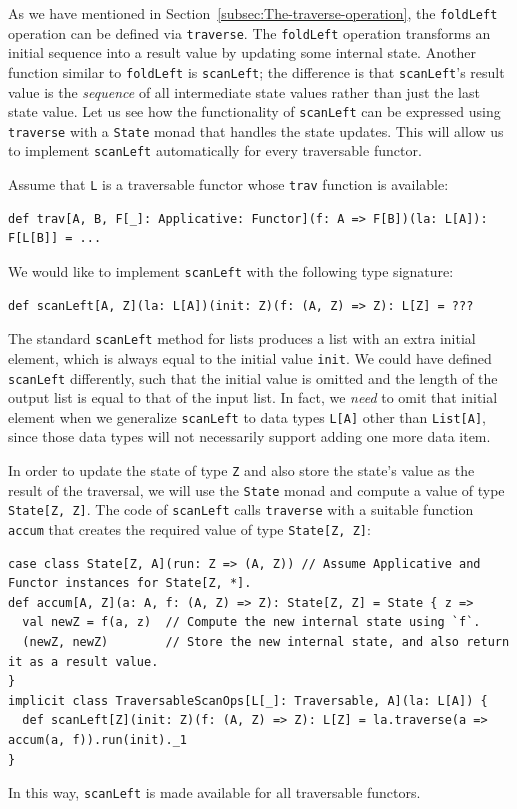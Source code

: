 As we have mentioned in Section~\ref{subsec:The-traverse-operation},
the \lstinline!foldLeft! operation can be defined via \lstinline!traverse!.
The \lstinline!foldLeft! operation transforms an initial sequence
into a result value by updating some internal state. Another function
similar to \lstinline!foldLeft! is \lstinline!scanLeft!; the difference
is that \lstinline!scanLeft!\textsf{'}s result value is the \emph{sequence}
of all intermediate state values rather than just the last state value.
Let us see how the functionality of \lstinline!scanLeft! can be expressed
using \lstinline!traverse! with a \lstinline!State! monad that handles
the state updates. This will allow us to implement \lstinline!scanLeft!
automatically for every traversable functor.

Assume that \lstinline!L! is a traversable functor whose \lstinline!trav!
function is available:
\begin{lstlisting}
def trav[A, B, F[_]: Applicative: Functor](f: A => F[B])(la: L[A]): F[L[B]] = ...
\end{lstlisting}
We would like to implement \lstinline!scanLeft! with the following
type signature:
\begin{lstlisting}
def scanLeft[A, Z](la: L[A])(init: Z)(f: (A, Z) => Z): L[Z] = ???
\end{lstlisting}
The standard \lstinline!scanLeft! method for lists produces a list
with an extra initial element, which is always equal to the initial
value \lstinline!init!. We could have defined \lstinline!scanLeft!
differently, such that the initial value is omitted and the length
of the output list is equal to that of the input list. In fact, we
\emph{need} to omit that initial element when we generalize \lstinline!scanLeft!
to data types \lstinline!L[A]! other than \lstinline!List[A]!, since
those data types will not necessarily support adding one more data
item.

In order to update the state of type \lstinline!Z! and also store
the state\textsf{'}s value as the result of the traversal, we will use the
\lstinline!State! monad and compute a value of type \lstinline!State[Z, Z]!.
The code of \lstinline!scanLeft! calls \lstinline!traverse! with
a suitable function \lstinline!accum! that creates the required value
of type \lstinline!State[Z, Z]!:
\begin{lstlisting}
case class State[Z, A](run: Z => (A, Z)) // Assume Applicative and Functor instances for State[Z, *].
def accum[A, Z](a: A, f: (A, Z) => Z): State[Z, Z] = State { z =>
  val newZ = f(a, z)  // Compute the new internal state using `f`.
  (newZ, newZ)        // Store the new internal state, and also return it as a result value.
}
implicit class TraversableScanOps[L[_]: Traversable, A](la: L[A]) {
  def scanLeft[Z](init: Z)(f: (A, Z) => Z): L[Z] = la.traverse(a => accum(a, f)).run(init)._1
}
\end{lstlisting}
In this way, \lstinline!scanLeft! is made available for all traversable
functors.

